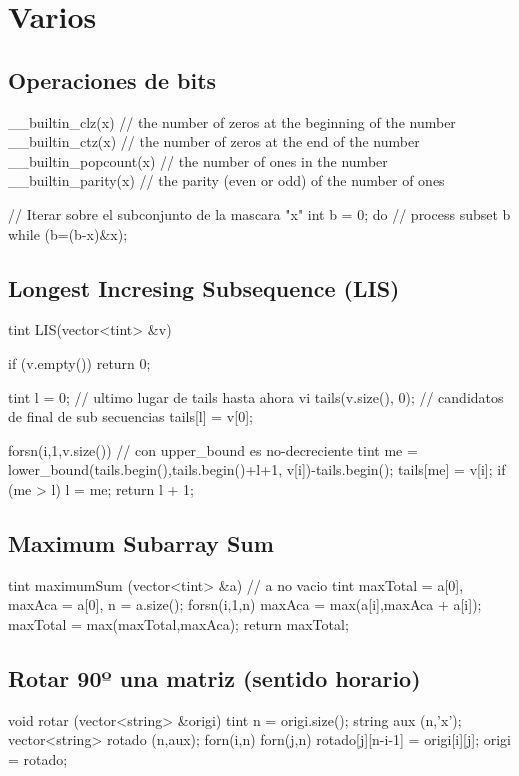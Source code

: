 \section{Varios}

\subsection{Operaciones de bits}

\begin{code}

__builtin_clz(x) // the number of zeros at the beginning of the number
__builtin_ctz(x) // the number of zeros at the end of the number
__builtin_popcount(x)  // the number of ones in the number
__builtin_parity(x) // the parity (even or odd) of the number of ones

// Iterar sobre el subconjunto de la mascara "x"
int b = 0;
do 
{
	// process subset b
} while (b=(b-x)&x);

\end{code}

\subsection{Longest Incresing Subsequence (LIS)}
\begin{code}
tint LIS(vector<tint> &v) {
  if (v.empty()) return 0;
  
  tint l = 0;             // ultimo lugar de tails hasta ahora
  vi tails(v.size(), 0);  // candidatos de final de sub secuencias
  tails[l] = v[0];
  
  forsn(i,1,v.size()) {
    // con upper_bound es no-decreciente
    tint me = lower_bound(tails.begin(),tails.begin()+l+1, v[i])-tails.begin();
    tails[me] = v[i];
    if (me > l) l = me;
  }
  return l + 1;
}
\end{code}

\subsection{Maximum Subarray Sum}
\begin{code}
tint maximumSum (vector<tint> &a) // a no vacio
{
	tint maxTotal = a[0], maxAca = a[0], n = a.size();
	forsn(i,1,n)
	{
		maxAca = max(a[i],maxAca + a[i]);
		maxTotal = max(maxTotal,maxAca);
	}
	return maxTotal;
}
\end{code}

\subsection{Rotar 90º una matriz (sentido horario)}
\begin{code}
void rotar (vector<string> &origi) 
{
	tint n = origi.size();
	string aux (n,'x');
	vector<string> rotado (n,aux);
	forn(i,n)
	forn(j,n)
		rotado[j][n-i-1] = origi[i][j];
	origi = rotado;
}
\end{code}

